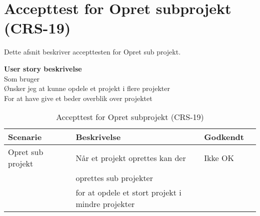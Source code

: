\section{Accepttest for Opret subprojekt (CRS-19)}
Dette afsnit beskriver accepttesten for Opret sub projekt.

\textbf{User story beskrivelse} \\
Som bruger \\
Ønsker jeg at kunne opdele et projekt i flere projekter \\
For at have give et beder overblik over projektet

\begin{table}[H]
	\centering
	\begin{tabular}{|ll|l|ll|} \hline
		\textbf{Scenarie} &  & \textbf{Beskrivelse}&  \textbf{Godkendt}&  \\ \hline
		Opret sub projekt&  &  Når et projekt oprettes kan der &  Ikke OK&  \\
		& & oprettes sub projekter & & \\
		& & for at opdele et stort projekt i mindre projekter& & \\ \hline
	\end{tabular}
	\caption{Accepttest for Opret subprojekt (CRS-19)}
	\label{AcceptSubProjekt}
\end{table}